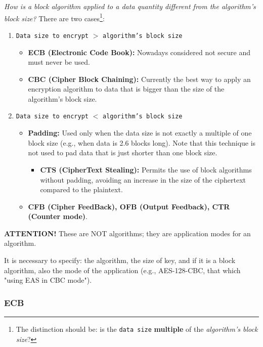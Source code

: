 \textit{How is a block algorithm applied to a data quantity different from the algorithm's block size?}
There are two cases\footnote{The distinction should be: is the \texttt{data size} \textbf{multiple} of the \textit{algorithm's block size}?}:
\begin{enumerate}
    \item \texttt{Data size to encrypt} $>$ \texttt{algorithm's block size}
          \begin{itemize}
              \item \textbf{ECB (Electronic Code Book):} Nowadays considered not secure and must never be used.
              \item \textbf{CBC (Cipher Block Chaining):} Currently the best way to apply an encryption algorithm to data that is bigger than the size of the algorithm's block size.
          \end{itemize}

    \item \texttt{Data size to encrypt} $<$ \texttt{algorithm's block size}
          \begin{itemize}
              \item \textbf{Padding:} Used only when the data size is not exactly a multiple of one block size (e.g., when data is 2.6 blocks long). Note that this technique is not used to pad data that is just shorter than one block size.
                    \begin{itemize}
                        \item \textbf{CTS (CipherText Stealing):} Permits the use of block algorithms without padding, avoiding an increase in the size of the ciphertext compared to the plaintext.
                    \end{itemize}
              \item \textbf{CFB (Cipher FeedBack), OFB (Output Feedback), CTR (Counter mode)}.
          \end{itemize}
\end{enumerate}
\textbf{ATTENTION!} These are NOT algorithms; they are application modes for an algorithm.

It is necessary to specify:
the algorithm, the size of key, and if it is a block algorithm, also the mode of the application (e.g., AES-128-CBC, that which "using EAS in CBC mode").


\subsubsection{ECB}
